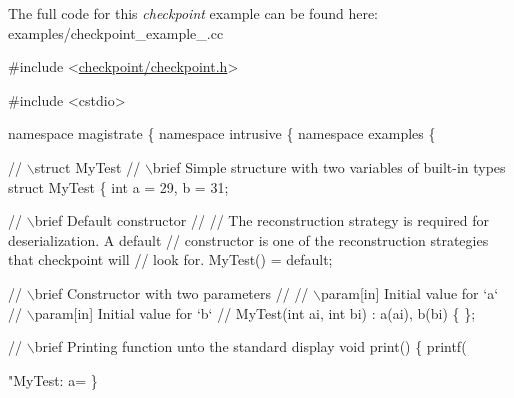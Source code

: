 The full code for this {\itshape checkpoint} example can be found here\+: {\ttfamily examples/checkpoint\+\_\+example\+\_.\+cc}


\begin{DoxyCodeInclude}

\textcolor{preprocessor}{#include <\hyperlink{checkpoint_8h}{checkpoint/checkpoint.h}>}

\textcolor{preprocessor}{#include <cstdio>}

\textcolor{keyword}{namespace }magistrate \{ \textcolor{keyword}{namespace }intrusive \{ \textcolor{keyword}{namespace }examples \{

\textcolor{comment}{// \(\backslash\)struct MyTest}
\textcolor{comment}{// \(\backslash\)brief Simple structure with two variables of built-in types}
\textcolor{keyword}{struct }MyTest \{
  \textcolor{keywordtype}{int} a = 29, b = 31;

  \textcolor{comment}{// \(\backslash\)brief Default constructor}
  \textcolor{comment}{//}
  \textcolor{comment}{// The reconstruction strategy is required for deserialization. A default}
  \textcolor{comment}{// constructor is one of the reconstruction strategies that checkpoint will}
  \textcolor{comment}{// look for.}
  MyTest() = \textcolor{keywordflow}{default};

  \textcolor{comment}{// \(\backslash\)brief Constructor with two parameters}
  \textcolor{comment}{//}
  \textcolor{comment}{// \(\backslash\)param[in] Initial value for `a`}
  \textcolor{comment}{// \(\backslash\)param[in] Initial value for `b`}
  \textcolor{comment}{//}
  MyTest(\textcolor{keywordtype}{int} ai, \textcolor{keywordtype}{int} bi) : a(ai), b(bi) \{ \};

  \textcolor{comment}{// \(\backslash\)brief Printing function unto the standard display}
  \textcolor{keywordtype}{void} print() \{
    printf(\textcolor{stringliteral}{"MyTest: a=%
  \}

}
\end{DoxyCodeInclude}
